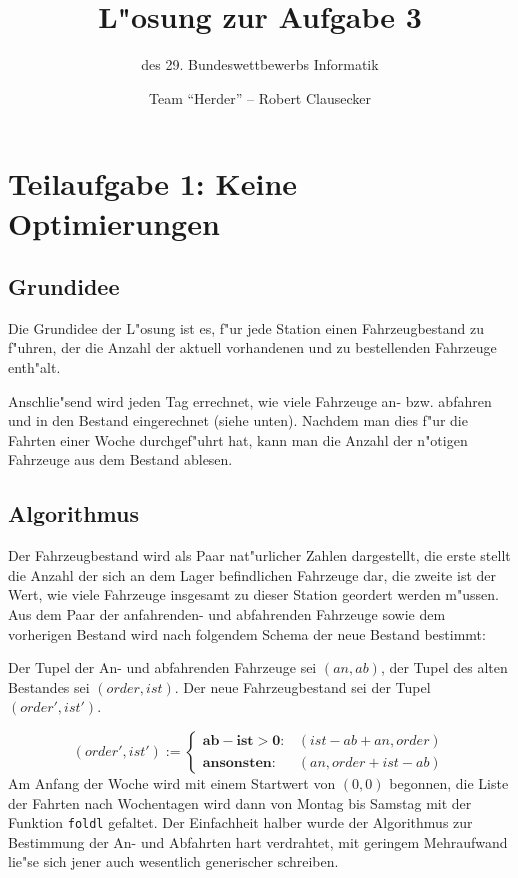 \documentclass{scrreprt}
\author {Team "`Herder"' -- Robert Clausecker}
\title {L"osung zur Aufgabe 3}
\subtitle {des 29. Bundeswettbewerbs Informatik}
\begin{document}
\maketitle

\tableofcontents \newpage


\chapter {Teilaufgabe 1: Keine Optimierungen}

\section {Grundidee}
Die Grundidee der L"osung ist es, f"ur jede Station einen Fahrzeugbestand zu
f"uhren, der die Anzahl der aktuell vorhandenen und zu bestellenden Fahrzeuge
enth"alt.

Anschlie"send wird jeden Tag errechnet, wie viele Fahrzeuge an- bzw. abfahren
und in den Bestand eingerechnet (siehe unten). Nachdem man dies f"ur die Fahrten
einer Woche durchgef"uhrt hat, kann man die Anzahl der n"otigen Fahrzeuge aus
dem Bestand ablesen.

\section {Algorithmus}
Der Fahrzeugbestand wird als Paar nat"urlicher Zahlen dargestellt, die
erste stellt die Anzahl der sich an dem Lager befindlichen Fahrzeuge dar, die
zweite ist der Wert, wie viele Fahrzeuge insgesamt zu dieser Station geordert
werden m"ussen.  Aus dem Paar der anfahrenden- und abfahrenden Fahrzeuge sowie
dem vorherigen Bestand wird nach folgendem Schema der neue Bestand bestimmt:

Der Tupel der An- und abfahrenden Fahrzeuge sei $(an,ab)$, der
Tupel des alten Bestandes sei $(order,ist)$. Der neue Fahrzeugbestand sei
der Tupel $(order',ist')$.

$$
(order',ist') := \left \{\begin{array}{rl}
\mathbf{ab - ist > 0:} & (ist - ab + an, order)
\\
\mathbf{ansonsten:}    & (an, order + ist - ab)
\end{array}\right .$$
Am Anfang der Woche wird mit einem Startwert von $(0,0)$ begonnen, die Liste der
Fahrten nach Wochentagen wird dann von Montag bis Samstag mit der Funktion
\texttt{foldl} gefaltet.  Der Einfachheit halber wurde der Algorithmus zur
Bestimmung der An- und Abfahrten hart verdrahtet, mit geringem Mehraufwand
lie"se sich jener auch wesentlich generischer schreiben.
\end{document}
